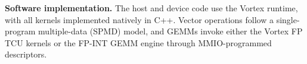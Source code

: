 \documentclass[sigconf,anonymous,nonacm]{acmart}
\newcommand{\fpint}{FP-INT}
\begin{document}

\textbf{Software implementation.} The host and device code use the Vortex runtime, with all kernels implemented natively in C++. Vector operations follow a single-program multiple-data (SPMD) model, and GEMMs invoke either the Vortex FP TCU kernels or the \fpint{} GEMM engine through MMIO-programmed descriptors.

\end{document}

